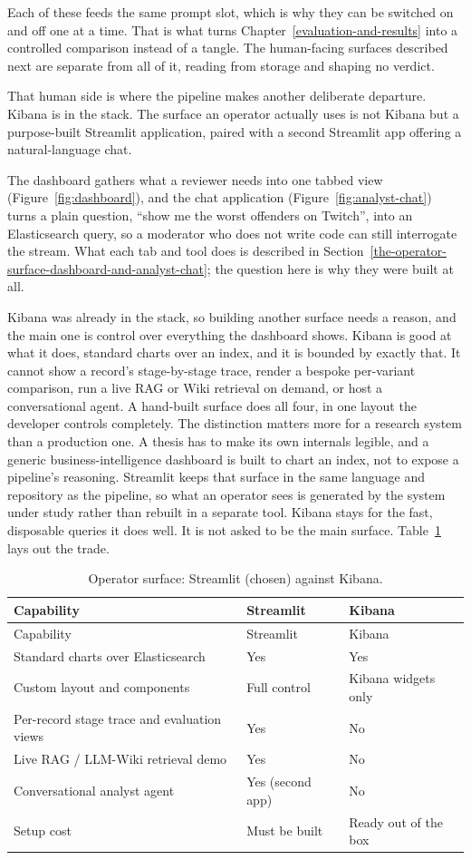 Each of these feeds the same prompt slot, which is why they can be switched on and off one at a time. That is what turns Chapter~\ref{evaluation-and-results} into a controlled comparison instead of a tangle. The human-facing surfaces described next are separate from all of it, reading from storage and shaping no verdict.

That human side is where the pipeline makes another deliberate departure. Kibana is in the stack. The surface an operator actually uses is not Kibana but a purpose-built Streamlit application, paired with a second Streamlit app offering a natural-language chat.

The dashboard gathers what a reviewer needs into one tabbed view (Figure~\ref{fig:dashboard}), and the chat application (Figure~\ref{fig:analyst-chat}) turns a plain question, ``show me the worst offenders on Twitch'', into an Elasticsearch query, so a moderator who does not write code can still interrogate the stream. What each tab and tool does is described in Section~\ref{the-operator-surface-dashboard-and-analyst-chat}; the question here is why they were built at all.

Kibana was already in the stack, so building another surface needs a reason, and the main one is control over everything the dashboard shows. Kibana is good at what it does, standard charts over an index, and it is bounded by exactly that. It cannot show a record's stage-by-stage trace, render a bespoke per-variant comparison, run a live RAG or Wiki retrieval on demand, or host a conversational agent. A hand-built surface does all four, in one layout the developer controls completely. The distinction matters more for a research system than a production one. A thesis has to make its own internals legible, and a generic business-intelligence dashboard is built to chart an index, not to expose a pipeline's reasoning. Streamlit keeps that surface in the same language and repository as the pipeline, so what an operator sees is generated by the system under study rather than rebuilt in a separate tool. Kibana stays for the fast, disposable queries it does well. It is not asked to be the main surface. Table~\ref{tab:operator-surface} lays out the trade.

\begin{longtable}{@{}lll@{}}
\caption{Operator surface: Streamlit (chosen) against Kibana.}\label{tab:operator-surface}\tabularnewline
\toprule
Capability & Streamlit & Kibana \\
\midrule
\endfirsthead
\toprule
Capability & Streamlit & Kibana \\
\midrule
\endhead
\bottomrule
\endlastfoot
Standard charts over Elasticsearch & Yes & Yes \\
Custom layout and components & Full control & Kibana widgets only \\
Per-record stage trace and evaluation views & Yes & No \\
Live RAG / LLM-Wiki retrieval demo & Yes & No \\
Conversational analyst agent & Yes (second app) & No \\
Setup cost & Must be built & Ready out of the box \\
\end{longtable}

